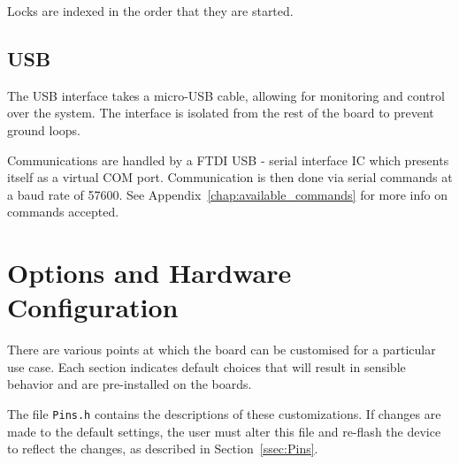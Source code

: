 \documentclass[11pt]{report}
\newcommand{\baudrate}{57600}
\begin{document}
Locks are indexed in the order that they are started. 

\section{USB}

The USB interface takes a micro-USB cable, allowing for monitoring and control over the system. The interface is isolated from the rest of the board to prevent ground loops. 

Communications are handled by a FTDI USB - serial interface IC which presents itself as a virtual COM port. Communication is then done via serial commands at a baud rate of \baudrate. See Appendix~\ref{chap:available_commands} for more info on commands accepted. 





\chapter{Options and Hardware Configuration} %
\label{sec:options_and_hardware_configuration}

There are various points at which the board can be customised for a particular use case. Each section indicates default choices that will result in sensible behavior and are pre-installed on the boards. 

The file {\tt Pins.h} contains the descriptions of these customizations. If changes are made to the default settings, the user must alter this file and re-flash the device to reflect the changes, as described in Section~\ref{ssec:Pins}. 

\end{document}
